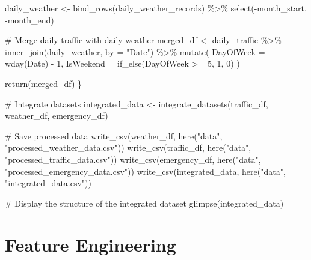 \documentclass[
  letterpaper,
  DIV=11,
  numbers=noendperiod]{scrreprt}
\newenvironment{Shaded}{\begin{snugshade}}{\end{snugshade}}
\newcommand{\AttributeTok}[1]{\textcolor[rgb]{0.40,0.45,0.13}{#1}}
\newcommand{\CommentTok}[1]{\textcolor[rgb]{0.37,0.37,0.37}{#1}}
\newcommand{\DecValTok}[1]{\textcolor[rgb]{0.68,0.00,0.00}{#1}}
\newcommand{\FunctionTok}[1]{\textcolor[rgb]{0.28,0.35,0.67}{#1}}
\newcommand{\NormalTok}[1]{\textcolor[rgb]{0.00,0.23,0.31}{#1}}
\newcommand{\OtherTok}[1]{\textcolor[rgb]{0.00,0.23,0.31}{#1}}
\newcommand{\SpecialCharTok}[1]{\textcolor[rgb]{0.37,0.37,0.37}{#1}}
\newcommand{\StringTok}[1]{\textcolor[rgb]{0.13,0.47,0.30}{#1}}
\begin{document}
\begin{Shaded}
\begin{Highlighting}[]
\NormalTok{  daily\_weather }\OtherTok{\textless{}{-}} \FunctionTok{bind\_rows}\NormalTok{(daily\_weather\_records) }\SpecialCharTok{\%\textgreater{}\%}
    \FunctionTok{select}\NormalTok{(}\SpecialCharTok{{-}}\NormalTok{month\_start, }\SpecialCharTok{{-}}\NormalTok{month\_end)}
  
  \CommentTok{\# Merge daily traffic with daily weather}
\NormalTok{  merged\_df }\OtherTok{\textless{}{-}}\NormalTok{ daily\_traffic }\SpecialCharTok{\%\textgreater{}\%}
    \FunctionTok{inner\_join}\NormalTok{(daily\_weather, }\AttributeTok{by =} \StringTok{"Date"}\NormalTok{) }\SpecialCharTok{\%\textgreater{}\%}
    \FunctionTok{mutate}\NormalTok{(}
      \AttributeTok{DayOfWeek =} \FunctionTok{wday}\NormalTok{(Date) }\SpecialCharTok{{-}} \DecValTok{1}\NormalTok{,}
      \AttributeTok{IsWeekend =} \FunctionTok{if\_else}\NormalTok{(DayOfWeek }\SpecialCharTok{\textgreater{}=} \DecValTok{5}\NormalTok{, }\DecValTok{1}\NormalTok{, }\DecValTok{0}\NormalTok{)}
\NormalTok{    )}
  
  \FunctionTok{return}\NormalTok{(merged\_df)}
\NormalTok{\}}

\CommentTok{\# Integrate datasets}
\NormalTok{integrated\_data }\OtherTok{\textless{}{-}} \FunctionTok{integrate\_datasets}\NormalTok{(traffic\_df, weather\_df, emergency\_df)}

\CommentTok{\# Save processed data}
\FunctionTok{write\_csv}\NormalTok{(weather\_df, }\FunctionTok{here}\NormalTok{(}\StringTok{"data"}\NormalTok{, }\StringTok{"processed\_weather\_data.csv"}\NormalTok{))}
\FunctionTok{write\_csv}\NormalTok{(traffic\_df, }\FunctionTok{here}\NormalTok{(}\StringTok{"data"}\NormalTok{, }\StringTok{"processed\_traffic\_data.csv"}\NormalTok{))}
\FunctionTok{write\_csv}\NormalTok{(emergency\_df, }\FunctionTok{here}\NormalTok{(}\StringTok{"data"}\NormalTok{, }\StringTok{"processed\_emergency\_data.csv"}\NormalTok{))}
\FunctionTok{write\_csv}\NormalTok{(integrated\_data, }\FunctionTok{here}\NormalTok{(}\StringTok{"data"}\NormalTok{, }\StringTok{"integrated\_data.csv"}\NormalTok{))}

\CommentTok{\# Display the structure of the integrated dataset}
\FunctionTok{glimpse}\NormalTok{(integrated\_data)}
\end{Highlighting}
\end{Shaded}

\section{Feature Engineering}\label{feature-engineering}
\end{document}

